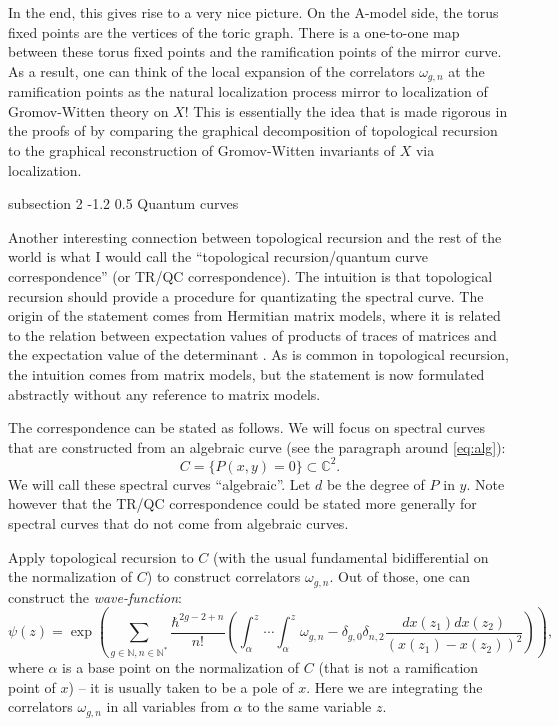 \documentclass[reqno,oneside,11pt]{amsart}
\makeatletter
\theoremstyle{plain}
\theoremstyle{definition}
\theoremstyle{remark}
\numberwithin{equation}{section}
\renewcommand{\subsection}{\@startsection
{subsection}%
{2}%
{\z@}%
{-1.2\baselineskip}%
{0.5\baselineskip}%
{\normalfont \bf \normalsize}} %
\makeatother
\begin{document}
In the end, this gives rise to a very nice picture. On the A-model side, the torus fixed points are the vertices of the toric graph. There is a one-to-one map between these torus fixed points and the ramification points of the mirror curve. As a result, one can think of the local expansion of the correlators $\omega_{g,n}$ at the ramification points as the natural localization process mirror to localization of Gromov-Witten theory on $X$! This is essentially the idea that is made rigorous in the proofs of \cite{EO12,FLZ13,FLZ16} by comparing the graphical decomposition of topological recursion to the graphical reconstruction of Gromov-Witten invariants of $X$ via localization.


 

\subsection{Quantum curves}

Another interesting connection between topological recursion and the rest of the world is what I would call the ``topological recursion/quantum curve correspondence'' (or TR/QC correspondence). The intuition is that topological recursion should provide a procedure for quantizating the spectral curve. The origin of the statement comes from Hermitian matrix models, where it  is related to the relation between expectation values of products of traces of matrices and the expectation value of the determinant \cite{BE09}. As is common in topological recursion, the intuition comes from matrix models, but the statement is now formulated abstractly without any reference to matrix models.

The correspondence can be stated as follows. We will focus on spectral curves that are constructed from an algebraic curve (see the paragraph around \eqref{eq:alg}):
\begin{equation}
C=\{P(x,y) = 0 \} \subset \mathbb{C}^2.
\end{equation}
We will call these spectral curves ``algebraic''. Let $d$ be the degree of $P$ in $y$. Note however that the TR/QC correspondence could be stated more generally for spectral curves that do not come from algebraic curves.

Apply topological recursion to $C$ (with the usual fundamental bidifferential on the normalization of $C$) to construct correlators $\omega_{g,n}$. Out of those, one can construct the \emph{wave-function}:
\begin{equation}\label{eq:wf}
\psi(z) = \exp \left(\sum_{g \in \mathbb{N}, n \in \mathbb{N}^*} \frac{\hbar^{2g-2+n}}{n!} \left(\int^z_\alpha \cdots \int^z_\alpha \omega_{g,n} - \delta_{g,0} \delta_{n,2} \frac{dx(z_1) dx(z_2)}{(x(z_1)-x(z_2))^2} \right) \right),
\end{equation}
where $\alpha$ is a base point on the normalization of $C$ (that is not a ramification point of $x$) -- it is usually taken to be a pole of $x$. Here we are integrating the correlators $\omega_{g,n}$ in all variables from $\alpha$ to the same variable $z$. 
\end{document}
